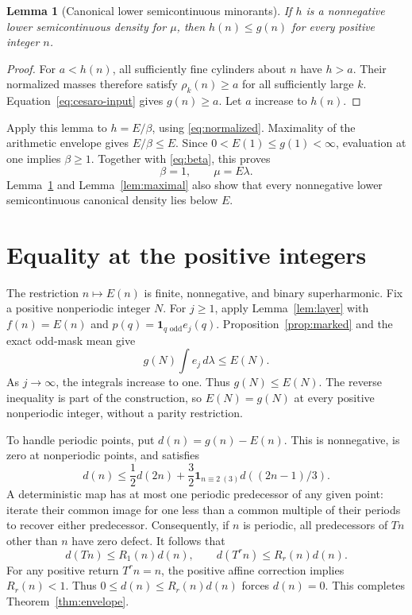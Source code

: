\documentclass[11pt]{article}
\newtheorem{lemma}[theorem]{Lemma}
\theoremstyle{remark}
\newcommand{\one}{\mathbf 1}
\begin{document}
\begin{lemma}[Canonical lower semicontinuous minorants]\label{lem:lsc-bound}
If \(h\) is a nonnegative lower semicontinuous density for \(\mu\),
then \(h(n)\leq g(n)\) for every positive integer \(n\).
\end{lemma}

\begin{proof}
For \(a<h(n)\), all sufficiently fine cylinders about \(n\)
have \(h>a\). Their normalized masses therefore satisfy
\(\rho_k(n)\geq a\) for all sufficiently large \(k\).
Equation~\eqref{eq:cesaro-input} gives \(g(n)\geq a\).
Let \(a\) increase to \(h(n)\).
\end{proof}

Apply this lemma to \(h=E/\beta\), using \eqref{eq:normalized}.
Maximality of the arithmetic envelope gives \(E/\beta\leq E\).
Since \(0<E(1)\leq g(1)<\infty\), evaluation at one implies
\(\beta\geq1\). Together with \eqref{eq:beta}, this proves
\[
 \beta=1,\qquad \mu=E\lambda.
\]
Lemma~\ref{lem:lsc-bound} and Lemma~\ref{lem:maximal} also show
that every nonnegative lower semicontinuous canonical density lies
below \(E\).

\section{Equality at the positive integers}

The restriction \(n\mapsto E(n)\) is finite, nonnegative, and
binary superharmonic. Fix a positive nonperiodic integer \(N\).
For \(j\geq1\), apply Lemma~\ref{lem:layer} with
\(f(n)=E(n)\) and \(p(q)=\one_{q\text{ odd}}e_j(q)\).
Proposition~\ref{prop:marked} and the exact odd-mask mean give
\[
 g(N)\int e_j\,d\lambda\leq E(N).
\]
As \(j\to\infty\), the integrals increase to one. Thus
\(g(N)\leq E(N)\). The reverse inequality is part of the
construction, so \(E(N)=g(N)\) at every positive nonperiodic
integer, without a parity restriction.

To handle periodic points, put \(d(n)=g(n)-E(n)\).
This is nonnegative, is zero at nonperiodic points, and satisfies
\[
 d(n)\leq\frac12d(2n)+
       \frac32\one_{n\equiv2\ (3)}d((2n-1)/3).
\]
A deterministic map has at most one periodic predecessor of any
given point: iterate their common image for one less than a common
multiple of their periods to recover either predecessor.
Consequently, if \(n\) is periodic, all predecessors of \(Tn\)
other than \(n\) have zero defect. It follows that
\[
 d(Tn)\leq R_1(n)d(n),\qquad
 d(T^rn)\leq R_r(n)d(n).
\]
For any positive return \(T^rn=n\), the positive affine
correction implies \(R_r(n)<1\). Thus
\(0\leq d(n)\leq R_r(n)d(n)\) forces \(d(n)=0\).
This completes Theorem~\ref{thm:envelope}.
\end{document}
